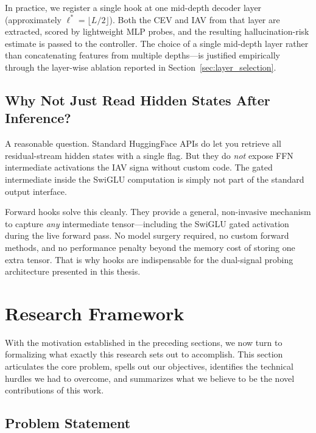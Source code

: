 In practice, we register a single hook at one mid-depth decoder layer (approximately $\ell^* = \lfloor L/2 \rfloor$). Both the CEV and IAV from that layer are extracted, scored by lightweight MLP probes, and the resulting hallucination-risk estimate is passed to the controller. The choice of a single mid-depth layer rather than concatenating features from multiple depths—is justified empirically through the layer-wise ablation reported in Section~\ref{sec:layer_selection}.

\subsection{Why Not Just Read Hidden States After Inference?}
\label{subsec:why_not_after}

A reasonable question. Standard HuggingFace APIs do let you retrieve all residual-stream hidden states with a single flag. But they do \emph{not} expose FFN intermediate activations the IAV signa without custom code. The gated intermediate inside the SwiGLU computation is simply not part of the standard output interface.

Forward hooks solve this cleanly. They provide a general, non-invasive mechanism to capture \emph{any} intermediate tensor—including the SwiGLU gated activation during the live forward pass. No model surgery required, no custom forward methods, and no performance penalty beyond the memory cost of storing one extra tensor. That is why hooks are indispensable for the dual-signal probing architecture presented in this thesis.



\section{Research Framework}
\label{sec:research_framework}

With the motivation established in the preceding sections, we now turn to formalizing what exactly this research sets out to accomplish. This section articulates the core problem, spells out our objectives, identifies the technical hurdles we had to overcome, and summarizes what we believe to be the novel contributions of this work.

\subsection{Problem Statement}
\label{subsec:problem_statement}

